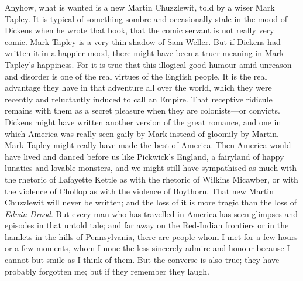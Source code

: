 \documentclass{book}
\begin{document}
Anyhow, what is wanted is a new Martin Chuzzlewit, told by a wiser Mark Tapley. It is typical of something sombre and occasionally stale in the mood of Dickens when he wrote that book, that the comic servant is not really very comic. Mark Tapley is a very thin shadow of Sam Weller. But if Dickens had written it in a happier mood, there might have been a truer meaning in Mark Tapley’s happiness. For it is true that this illogical good humour amid unreason and disorder is one of the real virtues of the English people. It is the real advantage they have in that adventure all over the world, which they were recently and reluctantly induced to call an Empire. That receptive ridicule remains with them as a secret pleasure when they are colonists—or convicts. Dickens might have written another version of the great romance, and one in which America was really seen gaily by Mark instead of gloomily by Martin. Mark Tapley might really have made the best of America. Then America would have lived and danced before us like Pickwick’s England, a fairyland of happy lunatics and lovable monsters, and we might still have sympathised as much with the rhetoric of Lafayette Kettle as with the rhetoric of Wilkins Micawber, or with the violence of Chollop as with the violence of Boythorn. That new Martin Chuzzlewit will never be written; and the loss of it is more tragic than the loss of \emph{Edwin Drood}. But every man who has travelled in America has seen glimpses and episodes in that untold tale; and far away on the Red-Indian frontiers or in the hamlets in the hills of Pennsylvania, there are people whom I met for a few hours or a few moments, whom I none the less sincerely admire and honour because I cannot but smile as I think of them. But the converse is also true; they have probably forgotten me; but if they remember they laugh.
\end{document}
